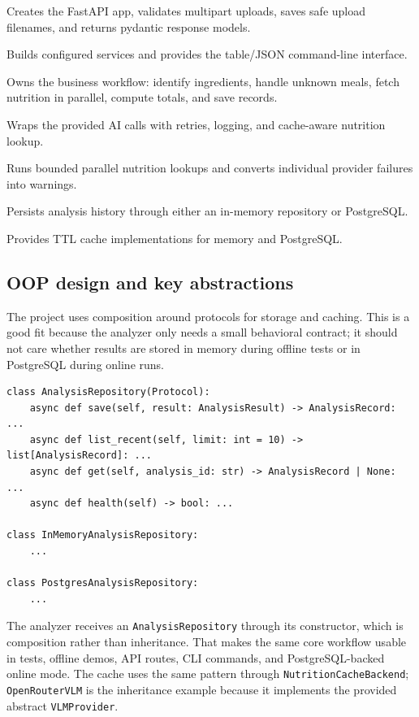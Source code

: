 \documentclass[11pt,a4paper]{article}
\begin{document}
\begin{description}[leftmargin=2.8cm,style=nextline]
  \item[\texttt{foodanalyzer.api}] Creates the FastAPI app, validates multipart uploads, saves safe upload filenames, and returns pydantic response models.
  \item[\texttt{foodanalyzer.cli}] Builds configured services and provides the table/JSON command-line interface.
  \item[\texttt{AnalyzerService}] Owns the business workflow: identify ingredients, handle unknown meals, fetch nutrition in parallel, compute totals, and save records.
  \item[\texttt{AIService}] Wraps the provided AI calls with retries, logging, and cache-aware nutrition lookup.
  \item[\texttt{concurrency.pipeline}] Runs bounded parallel nutrition lookups and converts individual provider failures into warnings.
  \item[\texttt{storage.repository}] Persists analysis history through either an in-memory repository or PostgreSQL.
  \item[\texttt{services.nutrition\_cache}] Provides TTL cache implementations for memory and PostgreSQL.
\end{description}

\subsection{OOP design and key abstractions}

The project uses composition around protocols for storage and caching. This is a good fit because the analyzer only needs a small behavioral contract; it should not care whether results are stored in memory during offline tests or in PostgreSQL during online runs.

\begin{lstlisting}[style=python]
class AnalysisRepository(Protocol):
    async def save(self, result: AnalysisResult) -> AnalysisRecord: ...
    async def list_recent(self, limit: int = 10) -> list[AnalysisRecord]: ...
    async def get(self, analysis_id: str) -> AnalysisRecord | None: ...
    async def health(self) -> bool: ...

class InMemoryAnalysisRepository:
    ...

class PostgresAnalysisRepository:
    ...
\end{lstlisting}

The analyzer receives an \texttt{AnalysisRepository} through its constructor, which is composition rather than inheritance. That makes the same core workflow usable in tests, offline demos, API routes, CLI commands, and PostgreSQL-backed online mode. The cache uses the same pattern through \texttt{NutritionCacheBackend}; \texttt{OpenRouterVLM} is the inheritance example because it implements the provided abstract \texttt{VLMProvider}.
\end{document}
